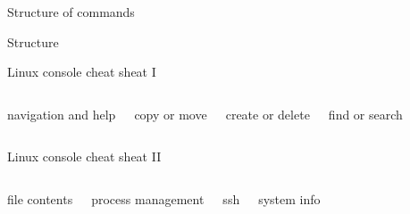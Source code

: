 \documentclass{beamer}
\begin{document}
\begin{frame}[fragile]{Structure of commands}
  \begin{block}{Structure}
    
  \end{block}
  \begin{example}
    
  \end{example}
\end{frame}


\begin{frame}[fragile]{Linux console cheat sheat I}
  \fontsize{7pt}{7}\selectfont
  \begin{columns}
    \begin{block}{navigation and help}
      
    \end{block}
    \begin{block}{copy or move}
      
    \end{block}

    \begin{block}{create or delete}
      
    \end{block}
    \begin{block}{find or search}
      
    \end{block}
  \end{columns}
\end{frame}

\begin{frame}[fragile]{Linux console cheat sheat II}
  \fontsize{7pt}{7}\selectfont
  \begin{columns}
    \begin{block}{file contents}
      
    \end{block}
    \begin{block}{process management}
      
    \end{block}

    \begin{block}{ssh}
      
    \end{block}
    \begin{block}{system info}
      
    \end{block}
  \end{columns}
\end{frame}
\end{document}

